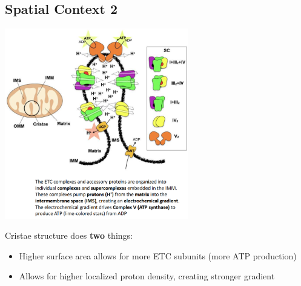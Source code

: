 \documentclass[10pt]{article}
\begin{document}
\subsection*{Spatial Context 2}
\begin{center} 
	\includegraphics*[width=0.6\textwidth]{../Week 9/L3_7.png}
\end{center}
Cristae structure does \textbf{two} things:
\begin{itemize}
	\item Higher surface area allows for more ETC subunits (more ATP production)
	\item Allows for higher localized proton density, creating stronger gradient
\end{itemize}
\end{document}
